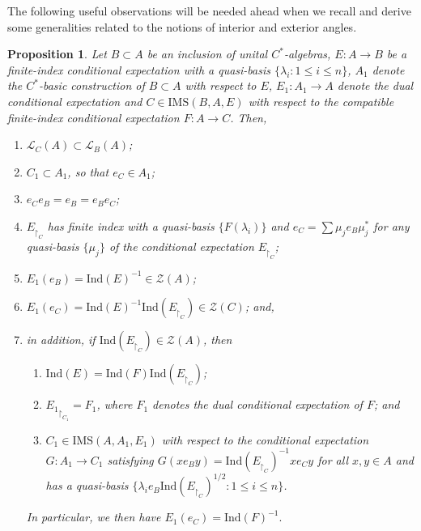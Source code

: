 \documentclass[a4]{amsart}
\newtheorem{proposition}[theorem]{\bf Proposition}
\numberwithin{equation}{section}
\newcommand{\mcal}{\mathcal}
\begin{document}
The following useful observations will be needed ahead when we recall and derive some generalities related to the notions of interior and exterior angles.
\begin{proposition}\label{eC-e1}
  Let $B \subset A$ be an inclusion of unital $C^*$-algebras, $E: A
  \to B$ be a finite-index conditional expectation with a quasi-basis
  $\{\lambda_i: 1 \leq i \leq n\}$, $A_1$ denote the
  $C^*$-basic construction of $B \subset A$ with respect to $E$, $E_1:
  A_1 \to A$ denote the dual conditional expectation and $C \in
  \mathrm{IMS}(B, A, E)$ with respect to the compatible finite-index
  conditional expectation $F: A \to C$.  Then,
\begin{enumerate}
\item $\mathcal{L}_C(A) \subset \mathcal{L}_B(A)$;
\item $C_1 \subset A_1$, so that $e_C \in A_1$;
\item $e_C e_B= e_B=e_B e_C$; 
  \item $E_{\restriction_C}$ has finite index with a quasi-basis
    $\{F(\lambda_i)\}$ and $e_C = \sum{\mu_j e_B \mu_j^*}$ for any
    quasi-basis $\{\mu_j \}$ of the conditional expectation
    $E_{\restriction_C}$;
  \item $E_1(e_B) = \mathrm{Ind}(E)^{-1}\in \mcal{Z}(A)$; 
  \item $E_1(e_C) = \mathrm{Ind}(E)^{-1} \mathrm{Ind}(E_{\restriction_C})\in \mcal{Z}(C) $; and,
  \item in addition, if $\mathrm{Ind}(E_{\restriction_C})\in \mcal{Z}(A)$, then
    \begin{enumerate}
    \item $\mathrm{Ind}(E) = \mathrm{Ind}(F) \mathrm{Ind}(E_{\restriction_C})$; 
       \item ${E_1}_{\restriction_{C_1}} = F_1$, where $F_1$ denotes the dual conditional expectation of $F$; and
       \item $C_1 \in \mathrm{IMS}(A, A_1, E_1)$ with respect to the
         conditional expectation $G: A_1 \to C_1$ satisfying $G(xe_By)
         = \mathrm{Ind}(E_{\restriction_C})^{-1} xe_Cy$ for all $x,y \in A$ and has a quasi-basis
         $\{\lambda_i e_B \mathrm{Ind}(E_{\restriction_{C}})^{1/2} :
         1\leq i \leq n\}$.
    \end{enumerate}
       In particular,  we   then have
       \(
       E_1(e_C) = \mathrm{Ind}(F)^{-1}.
       \)
\end{enumerate}
\end{proposition}
\end{document}
